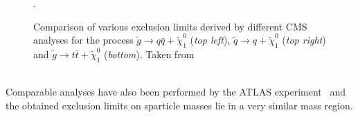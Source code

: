 \begin{figure}[!h]
  \centering
{}

  \caption{Comparison of various exclusion limits derived by different CMS analyses for the process $\tilde{g} \rightarrow q\bar{q} + \tilde{\chi}_1^0$ (\textit{top left}), $\tilde{q} \rightarrow q + \tilde{\chi}_1^0$ (\textit{top right}) and $\tilde{g} \rightarrow t\bar{t} + \tilde{\chi}_1^0$ (\textit{bottom}). Taken from~\cite{bib:CMS:PhysicsResultsSUS}}.
  \label{fig:result_comp}
\end{figure}
\\
Comparable analyses have also been performed by the ATLAS experiment~\cite{Aad:2014wea, Aad:2013wta, Aad:2014lra} and the obtained exclusion limits on sparticle masses lie in a very similar mass region.

